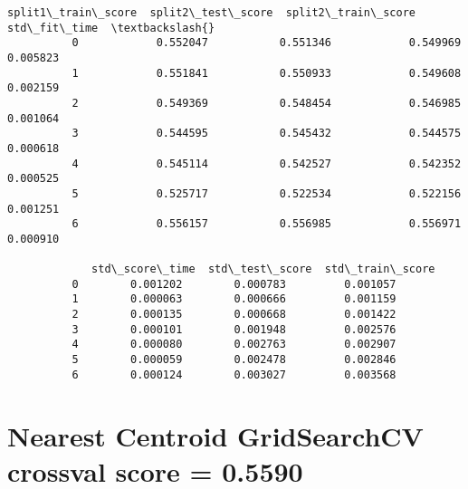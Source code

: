 \documentclass[11pt]{article}
\begin{document}
\begin{Verbatim}[commandchars=\\\{\}]
             split1\_train\_score  split2\_test\_score  split2\_train\_score  std\_fit\_time  \textbackslash{}
          0            0.552047           0.551346            0.549969      0.005823   
          1            0.551841           0.550933            0.549608      0.002159   
          2            0.549369           0.548454            0.546985      0.001064   
          3            0.544595           0.545432            0.544575      0.000618   
          4            0.545114           0.542527            0.542352      0.000525   
          5            0.525717           0.522534            0.522156      0.001251   
          6            0.556157           0.556985            0.556971      0.000910   
          
             std\_score\_time  std\_test\_score  std\_train\_score  
          0        0.001202        0.000783         0.001057  
          1        0.000063        0.000666         0.001159  
          2        0.000135        0.000668         0.001422  
          3        0.000101        0.001948         0.002576  
          4        0.000080        0.002763         0.002907  
          5        0.000059        0.002478         0.002846  
          6        0.000124        0.003027         0.003568  
\end{Verbatim}
        
    \section{Nearest Centroid GridSearchCV crossval score =
0.5590}\label{nearest-centroid-gridsearchcv-crossval-score-0.5590}
\end{document}
